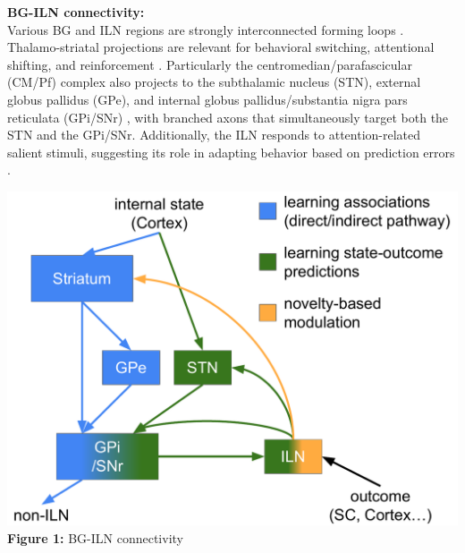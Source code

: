 \documentclass[portrait,final,a0paper,fontscale=0.30]{baposter}
\begin{document}
\begin{poster}
{\begin{adjustbox}{minipage=\textwidth, margin=2pt, center}
\begin{minipage}{0.26\textwidth}
        \textbf{BG-ILN connectivity:}\\
        Various BG and ILN regions are strongly interconnected forming loops \parencite{cover_rostral_2021, gonzalo-martin_micropopulation_2024, smith_thalamostriatal_2014}. Thalamo-striatal projections are relevant for behavioral switching, attentional shifting, and reinforcement \parencite{smith_thalamostriatal_2014,cover_activation_2019, cover_rostral_2023}. Particularly the centromedian/parafascicular (CM/Pf) complex also projects to the subthalamic nucleus (STN), external globus pallidus (GPe), and internal globus pallidus/substantia nigra pars reticulata (GPi/SNr) \parencite{gonzalo-martin_micropopulation_2024,castle_thalamic_2005,kita_intralaminar_2016,hanini-daoud_processing_2022}, with branched axons that simultaneously target both the STN and the GPi/SNr. Additionally, the ILN responds to attention-related salient stimuli, suggesting its role in adapting behavior based on prediction errors \parencite{minamimoto_participation_2002,smith_thalamostriatal_2014}.
    \end{minipage}
    \hspace{0.01\textwidth}
    \begin{minipage}{0.25\textwidth}
        \centering
        \includegraphics[width=\textwidth]{figures/circuit_idea_1.pdf}
        \textbf{Figure 1:} BG-ILN connectivity
    \end{minipage}
    \hspace{0.01\textwidth}
    \begin{minipage}{0.25\textwidth}
        \centering

\end{minipage}
\end{adjustbox}}
\end{poster}
\end{document}
